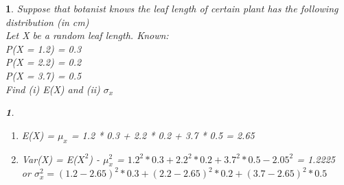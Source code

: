 \documentclass[11pt]{article}
\newtheorem*{solution}{\framebox{Sol}}
\newtheorem{example}{\framebox{Ex}}[section]
\newcommand\tab[1][1cm]{\hspace*{#1}}
\begin{document}
            \begin{example}
                Suppose that botanist knows the leaf length of certain plant has the following distribution (in cm) \\
                Let X be a random leaf length. Known: \\
                \tab P(X = 1.2) = 0.3 \\
                \tab P(X = 2.2) = 0.2 \\
                \tab P(X = 3.7) = 0.5 \\
                Find (i) E(X) and (ii) $\sigma_x$
                \begin{solution} \tab 
                    \begin{enumerate}
                        \item[i] E(X) = $\mu_x$ = 1.2 * 0.3 + 2.2 * 0.2 + 3.7 * 0.5 = 2.65
                        \item[ii] Var(X) = E($X^2$) - $\mu_x^2$ = $1.2^2 * 0.3 + 2.2^2 * 0.2 + 3.7^2 * 0.5 - 2.05^2$ = 1.2225 \\
                                    or $\sigma^2_x = (1.2 - 2.65)^2 * 0.3 + (2.2 - 2.65)^2 * 0.2 + (3.7 - 2.65)^2 * 0.5 $  
                    \end{enumerate}
                \end{solution}
            \end{example}
            
\end{document}

